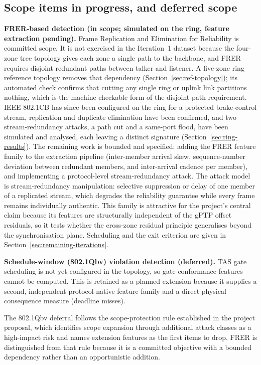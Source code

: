 \subsection*{Scope items in progress, and deferred scope}
\textbf{FRER-based detection (in scope; simulated on the ring, feature extraction pending).}
Frame Replication and Elimination for Reliability is committed scope. It is not
exercised in the Iteration~1 dataset because the four-zone tree topology gives each zone
a single path to the backbone, and FRER requires disjoint redundant paths between talker
and listener. A five-zone ring reference topology removes that dependency
(Section~\ref{sec:ref-topology}); its automated check confirms that cutting any single
ring or uplink link partitions nothing, which is the machine-checkable form of the
disjoint-path requirement. IEEE 802.1CB has since been configured on the ring for a
protected brake-control stream, replication and duplicate elimination have been
confirmed, and two stream-redundancy attacks, a path cut and a same-port flood, have been
simulated and analysed, each leaving a distinct signature (Section~\ref{sec:ring-results}).
The remaining work is bounded and specified: adding the FRER feature family to the
extraction pipeline (inter-member arrival skew, sequence-number deviation between
redundant members, and inter-arrival cadence per member), and implementing a
protocol-level stream-redundancy attack. The attack model is stream-redundancy
manipulation: selective suppression or delay of one member of a replicated stream,
which degrades the reliability guarantee while every frame remains individually
authentic. This family is attractive for the project's central claim because its
features are structurally independent of the gPTP offset residuals, so it tests whether
the cross-zone residual principle generalises beyond the synchronisation plane.
Scheduling and the exit criterion are given in
Section~\ref{sec:remaining-iterations}.

\textbf{Schedule-window (802.1Qbv) violation detection (deferred).} TAS gate scheduling is not
yet configured in the topology, so gate-conformance features cannot be computed.
This is retained as a planned extension because it supplies a second, independent
protocol-native feature family and a direct physical consequence measure (deadline
misses).

The 802.1Qbv deferral follows the scope-protection rule established in the project
proposal, which identifies scope expansion through additional attack classes as a
high-impact risk and names extension features as the first items to drop. FRER is
distinguished from that rule because it is a committed objective with a bounded
dependency rather than an opportunistic addition.

